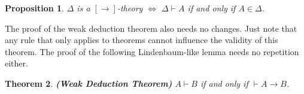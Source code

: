 \documentclass[12pt]{article}
\newtheorem{thm}{Theorem}[section]
\newtheorem{prop}[thm]{Proposition}
\begin{document}
\begin{prop}\label{a}
$ \Delta $ is a $[ \rightarrow ]$-theory $ \Longleftrightarrow $ $ \Delta\vdash A $ if and only if $ A \in \Delta $.
\end{prop}




The proof of the weak deduction theorem also needs no changes. Just note that any rule that only applies to theorems cannot influence the validity of this theorem. The proof of the following Lindenbaum-like lemma needs no repetition either. 

\begin{thm}\label{b}
\rm{\textbf{(Weak Deduction Theorem)}} $A\vdash B  $ if and only if $ \vdash A\rightarrow B $.
\end{thm}




\end{document}
